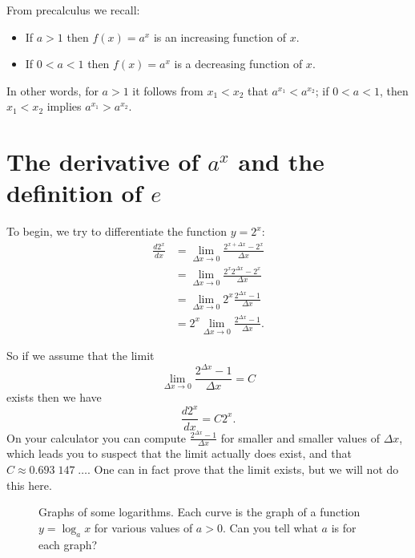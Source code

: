 From precalculus we recall:
\begin{itemize}
\item If $a>1$ then $f(x)=a^x$ is an increasing function of $x$.
\item If $0<a<1$ then $f(x)=a^x$ is a decreasing function of $x$.
\end{itemize}
In other words, for $a>1$ it follows from $x_1<x_2$ that
$a^{x_1}<a^{x_2}$; if $0<a<1$, then $x_1<x_2$ implies $a^{x_1} >
a^{x_2}$.

\section{The derivative of $a^x$ and the definition of $e$}
To begin, we try to differentiate the function $y=2^x$:
\begin{align*}
  \frac{d 2^x}{dx} 
  & = \lim_{\Delta x\to0}\frac{2^{x+\Delta x}-2^x}{\Delta x} \\
  & = \lim_{\Delta x\to0}\frac{2^{x}2^{\Delta x}-2^x}{\Delta x} \\
  & = \lim_{\Delta x\to0}2^x\frac{2^{\Delta x}-1}{\Delta x} \\
  & = 2^x \lim_{\Delta x\to0}\frac{2^{\Delta x}-1}{\Delta x}.
\end{align*}

So if we assume that the limit
\[
\lim_{\Delta x\to0}\frac{2^{\Delta x}-1}{\Delta x}=C
\]
exists then we have
\begin{equation}
  \label{eq:derivativeof2x}
  \frac{d 2^x}{dx} = C 2^x.
\end{equation}
On your calculator you can compute $\frac{2^{\Delta x}-1}{\Delta x}$
for smaller and smaller values of $\Delta x$, which leads you to
suspect that the limit actually does exist, and that $C\approx
0.693\;147\;\ldots$. One can in fact prove that the limit exists, but
we will not do this here.

\begin{figure}[!t]\centering
  
  \caption{Graphs of some logarithms.  Each curve is the graph of a
    function $y=\log_a x$ for various values of $a>0$.  Can you tell
    what $a$ is for each graph?}
  \label{fig:07logplot}
\end{figure}


